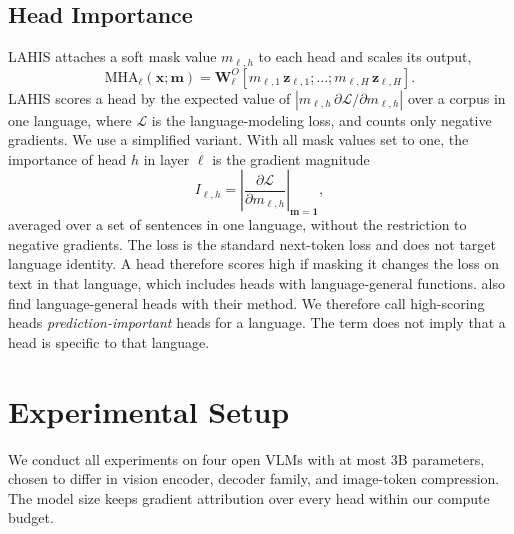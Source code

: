 \documentclass[10pt]{article}
\begin{document}
\subsection{Head Importance}

LAHIS \citep{liu2026lahis} attaches a soft mask value $m_{\ell,h}$ to each head and scales its output,
\begin{equation}
    \mathrm{MHA}_{\ell}(\mathbf{x}; \mathbf{m}) = \mathbf{W}^{O}_{\ell} \left[ m_{\ell,1}\,\mathbf{z}_{\ell,1}; \dots; m_{\ell,H}\,\mathbf{z}_{\ell,H} \right].
\end{equation}
LAHIS scores a head by the expected value of $\left| m_{\ell,h}\, \partial \mathcal{L} / \partial m_{\ell,h} \right|$ over a corpus in one language, where $\mathcal{L}$ is the language-modeling loss, and counts only negative gradients. We use a simplified variant. With all mask values set to one, the importance of head $h$ in layer $\ell$ is the gradient magnitude
\begin{equation}
    I_{\ell,h} = \left| \frac{\partial \mathcal{L}}{\partial m_{\ell,h}} \right|_{\mathbf{m}=\mathbf{1}},
\end{equation}
averaged over a set of sentences in one language, without the restriction to negative gradients. The loss is the standard next-token loss and does not target language identity. A head therefore scores high if masking it changes the loss on text in that language, which includes heads with language-general functions. \citet{liu2026lahis} also find language-general heads with their method. We therefore call high-scoring heads \emph{prediction-important} heads for a language. The term does not imply that a head is specific to that language.

\section{Experimental Setup}
\label{sec:setup}

We conduct all experiments on four open VLMs with at most 3B parameters, chosen to differ in vision encoder, decoder family, and image-token compression. The model size keeps gradient attribution over every head within our compute budget.
\end{document}
